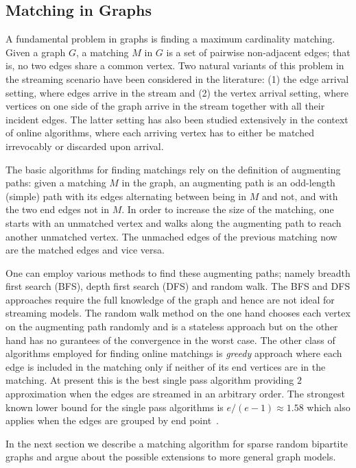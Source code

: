 \documentclass{scrartcl}
\begin{document}
\subsection{Matching in Graphs}
A fundamental problem in graphs is finding a maximum cardinality matching. Given a graph $G$, a matching $M$ in $G$ is a set of pairwise non-adjacent edges; that is, no two edges share a common vertex.
Two natural variants of this problem in the streaming scenario have been considered in the literature: (1) the edge
arrival setting, where edges arrive in the stream and (2) the vertex arrival setting, where vertices on one
side of the graph arrive in the stream together with all their incident edges.
The latter setting has also
been studied extensively in the context of online algorithms, where each arriving vertex has to either be
matched irrevocably or discarded upon arrival.

The basic algorithms for finding matchings rely on the definition of augmenting paths:
given a matching $M$ in the graph, an augmenting path is an odd-length
(simple) path with its edges alternating between being in $M$
and not, and with the two end edges not in $M$. In order to increase the size of the matching, one starts with an unmatched vertex and walks along the augmenting path to reach another unmatched vertex. The unmached edges of the previous matching now are the matched edges and vice versa.

One can employ various methods to find these augmenting paths; namely breadth first search (BFS), depth first search (DFS) and random walk. The BFS and DFS approaches require the full knowledge of the graph and hence are not ideal for streaming models. The random walk method on the one hand chooses each vertex on the augmenting path randomly and is a stateless approach but on the other hand has no gurantees of the convergence in the worst case.
The other class of algorithms employed for finding online matchings is \emph{greedy} approach where each edge is included in the matching only if neither of its end vertices are in the matching. At present this is the best single pass algorithm providing $2$ approximation when the edges are streamed in an arbitrary order. The strongest known lower bound for the single pass algorithms is $e/(e-1)\approx 1.58$ which also applies when the edges are grouped by end point~\cite{boundsKap,Goel}.

In the next section we describe  a matching algorithm for sparse random bipartite graphs and argue about the possible extensions to more general graph models. 
\end{document}
